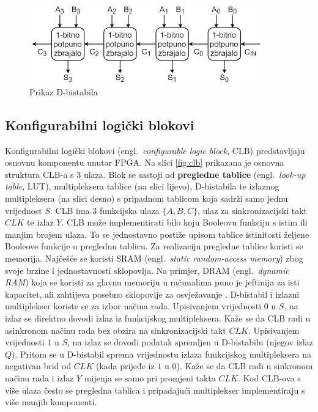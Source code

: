 \documentclass[times, utf8, diplomski]{fer}
\begin{document}
\begin{figure}[htb]
	\centering
	\includegraphics[width=0.9\textwidth]{img/ripple_adder.png}
	\caption{Prikaz D-bistabila}
	\label{fig:ripple-adder}
\end{figure}

\subsection{Konfigurabilni logički blokovi} \label{subsec:clb}

Konfigurabilni logički blokovi (engl.~\textit{configurable logic block}, CLB) predstavljaju osnovnu komponentu unutar FPGA. Na slici \ref{fig:clb} prikazana je osnovna struktura CLB-a s $3$ ulaza. Blok se sastoji od \textbf{pregledne tablice} (engl.~\textit{look-up table}, LUT), multipleksera tablice (na slici lijevo), D-bistabila te izlaznog multipleksera (na slici desno) s pripadnom tablicom koja sadrži samo jednu vrijednost $S$. CLB ima $3$ funkcijska ulaza $\{A, B, C\}$, ulaz za sinkronizacijski takt $CLK$ te izlaz $Y$. CLB može implementirati bilo koju Booleovu funkciju s istim ili manjim brojem ulaza. To se jednostavno postiže upisom tablice istinitosti željene Booleove funkcije u preglednu tablicu. Za realizaciju pregledne tablice koristi se memorija. Najčešće se koristi SRAM (engl.~\textit{static random-access memory}) zbog svoje brzine i jednostavnosti sklopovlja. Na primjer, DRAM (engl.~\textit{dynamic RAM}) koja se koristi za glavnu memoriju u računalima puno je jeftinija za isti kapacitet, ali zahtijeva posebno sklopovlje za osvježavanje \cite{book:memory}. D-bistabil i izlazni multiplekser koriste se za izbor načina rada. Upisivanjem vrijednosti $0$ u $S$, na izlaz se direktno dovodi izlaz iz funkcijskog multipleksera. Kaže se da CLB radi u asinkronom načinu rada bez obzira na sinkronizacijski takt $CLK$. Upisivanjem vrijednosti $1$ u $S$, na izlaz se dovodi podatak spremljen u D-bistabilu (njegov izlaz $Q$). Pritom se u D-bistabil sprema vrijednostu izlaza funkcijskog multipleksera na negativan brid od $CLK$ (kada prijeđe iz $1$ u $0$). Kaže se da CLB radi u sinkronom načinu rada i izlaz $Y$ mijenja se samo pri promjeni takta $CLK$. Kod CLB-ova s više ulaza često se pregledna tablica i pripadajući multiplekser implementiraju s više manjih komponenti.
\end{document}
